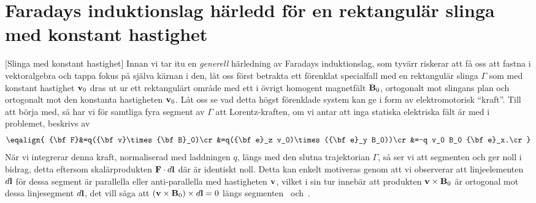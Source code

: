 {{{{\section{Faradays induktionslag h{\"a}rledd f{\"o}r en rektangul{\"a}r
  slinga med konstant hastighet}
[Slinga med konstant hastighet]
Innan vi tar itu en {\it generell} h{\"a}rledning av Faradays induktionslag,
som tyv{\"a}rr riskerar att f{\aa} oss att fastna i vektoralgebra och tappa
fokus p{\aa} sj{\"a}lva k{\"a}rnan i den, l{\aa}t oss f{\"o}rst betrakta ett
f{\"o}renklat specialfall med en rektangul{\"a}r slinga $\Gamma$ som med
konstant hastighet ${\bf v}_0$ dras ut ur ett rektangul{\"a}rt omr{\aa}de med
ett i {\"o}vrigt homogent magnetf{\"a}lt ${\bf B}_0$, ortogonalt mot slingans
plan
och ortogonalt mot den konstanta hastigheten ${\bf v}_0$.
\noindent
L{\aa}t oss se vad detta h{\"o}gst f{\"o}renklade system kan ge i form av
elektromotorisk ``kraft''. Till att b{\"o}rja med, s{\aa} har vi f{\"o}r
samtliga fyra segment av $\Gamma$ att Lorentz-kraften, om vi antar att inga
statiska elektriska f{\"a}lt {\"a}r med i problemet, beskrivs av
$$
  \eqalign{
    {\bf F}&=q({\bf v}\times{\bf B}_0)\cr
      &=q({\bf e}_z v_0)\times({\bf e}_y B_0))\cr
      &=-q v_0 B_0 {\bf e}_x.\cr
  }
$$
\vfill\eject
N{\"a}r vi integrerar denna kraft, normaliserad med laddningen $q$, l{\"a}ngs
med den slutna trajektorian $\Gamma$, s{\aa} ser vi att segmenten 
och  ger noll i bidrag, detta eftersom skal{\"a}rprodukten
${\bf F}\cdot d{\bf l}$ d{\"a}r {\"a}r identiskt noll.
Detta kan enkelt motiveras genom att vi observerar att linjeelementen $d{\bf l}$
f{\"o}r dessa segment {\"a}r parallella eller anti-parallella med hastigheten
${\bf v}$, vilket i sin tur inneb{\"a}r att produkten ${\bf v}\times{\bf B}_0$
{\"a}r ortogonal mot dessa linjesegment $d{\bf l}$, det vill s{\"a}ga att
$({\bf v}\times{\bf B}_0)\times d{\bf l}=0$ l{\"a}ngs segmenten~
och~.

}}}}
